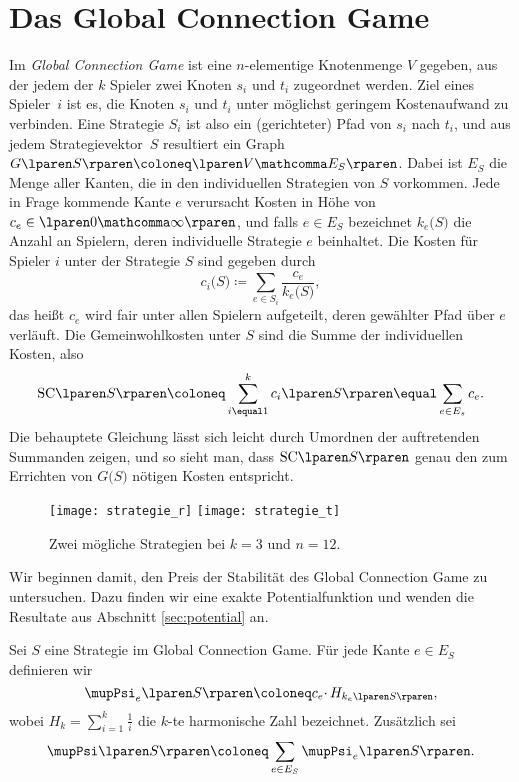 \section{Das Global Connection Game}
\label{sec:global}

Im \emph{Global Connection Game} ist
eine $n$-elementige Knotenmenge $V$ gegeben,
aus der jedem der $k$ Spieler zwei Knoten $s_i$ und $t_i$ zugeordnet werden.
Ziel eines Spieler~$i$ ist es,
die Knoten $s_i$ und $t_i$ unter möglichst geringem Kostenaufwand zu verbinden.
Eine Strategie $S_i$ ist also ein (gerichteter) Pfad von $s_i$ nach $t_i$,
und aus jedem Strategievektor~$S$ resultiert ein Graph
$G \lparen S \rparen \coloneq \lparen V \mathcomma E_S \rparen$.
Dabei ist $E_S$ die Menge aller Kanten,
die in den individuellen Strategien von $S$ vorkommen.
Jede in Frage kommende Kante $e$ verursacht Kosten in Höhe von
$c_e \in \lparen 0 \mathcomma \infty \rparen$,
und falls $e \in E_S$ bezeichnet $k_e \lparen S \rparen$ die Anzahl an Spielern,
deren individuelle Strategie $e$ beinhaltet.
Die Kosten für Spieler $i$ unter der Strategie $S$ sind gegeben durch
\[
  c_i \lparen S \rparen
  \coloneq
  \sum_{ e \in S_i } \frac{c_e}{k_e \lparen S \rparen},
\]
das heißt $c_e$ wird fair unter allen Spielern aufgeteilt,
deren gewählter Pfad über $e$ verläuft.
Die Gemeinwohlkosten unter $S$ sind
die Summe der individuellen Kosten,
also
\[
  \SC{S}
  \coloneq
  \sum_{ i \equal 1 }^k c_i \lparen S \rparen
  \equal \sum_{ e \in E_s } c_e.
\]
Die behauptete Gleichung lässt sich leicht
durch Umordnen der auftretenden Summanden zeigen,
und so sieht man, dass $\SC{S}$
genau den zum Errichten von $G \lparen S \rparen$ nötigen Kosten entspricht.

\begin{figure}[h]
  \centering
  \texttt{[image: strategie\_r]}
  \hfill
  \texttt{[image: strategie\_t]}
  \caption{Zwei mögliche Strategien bei $k \equal 3$ und $n \equal 12$.}
  \label{im:global}
\end{figure}

\medskip

Wir beginnen damit,
den Preis der Stabilität des Global Connection Game zu untersuchen.
Dazu finden wir eine exakte Potentialfunktion
und wenden die Resultate aus Abschnitt \ref{sec:potential} an.

\begin{definition}
\label{def_psi}
  Sei $S$ eine Strategie im Global Connection Game.
  Für jede Kante $e \in E_S$ definieren wir
  \[
    \mupPsi_e \lparen S \rparen
    \coloneq
    c_e \cdotp H_{ k_e \lparen S \rparen },
  \]
  wobei
  $H_k \equal \sum_{ i \equal 1 }^k \frac{1}{i}$
  die $k$-te harmonische Zahl bezeichnet.
  Zusätzlich sei
  \[
    \mupPsi \lparen S \rparen
    \coloneq
    \sum_{ e \in E_S } \mupPsi_e \lparen S \rparen.
  \]
\end{definition}

